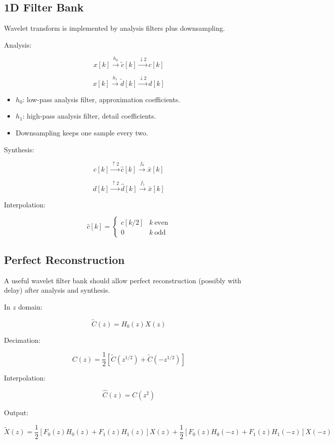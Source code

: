 \subsection{1D Filter Bank}

Wavelet transform is implemented by analysis filters plus downsampling.

Analysis:

\[
x[k]\xrightarrow{h_0}\tilde{c}[k]\xrightarrow{\downarrow2}c[k]
\]

\[
x[k]\xrightarrow{h_1}\tilde{d}[k]\xrightarrow{\downarrow2}d[k]
\]

\begin{itemize}
  \item $h_0$: low-pass analysis filter, approximation coefficients.
  \item $h_1$: high-pass analysis filter, detail coefficients.
  \item Downsampling keeps one sample every two.
\end{itemize}

Synthesis:

\[
c[k]\xrightarrow{\uparrow2}\hat{c}[k]\xrightarrow{f_0}\bar{x}[k]
\]

\[
d[k]\xrightarrow{\uparrow2}\hat{d}[k]\xrightarrow{f_1}\bar{x}[k]
\]

Interpolation:

\[
\hat{c}[k]=
\begin{cases}
c[k/2] & k\ \text{even}\\
0 & k\ \text{odd}
\end{cases}
\]

\subsection{Perfect Reconstruction}

A useful wavelet filter bank should allow perfect reconstruction (possibly with delay) after analysis and synthesis.

In $z$ domain:

\[
\tilde{C}(z)=H_0(z)X(z)
\]

Decimation:

\[
C(z)=\frac{1}{2}
\left[
\tilde{C}(z^{1/2})+\tilde{C}(-z^{1/2})
\right]
\]

Interpolation:

\[
\hat{C}(z)=C(z^2)
\]

Output:

\[
\tilde{X}(z)
=
\frac{1}{2}[F_0(z)H_0(z)+F_1(z)H_1(z)]X(z)
+
\frac{1}{2}[F_0(z)H_0(-z)+F_1(z)H_1(-z)]X(-z)
\]

